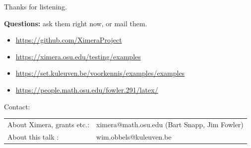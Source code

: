 \begin{frame}[t]{\centering Thanks for listening.}

  
  \vfill
  \textbf{\Large Questions:} ask them right now, or mail them.
  \vfill
  \begin{itemize}
  \item \url{https://github.com/XimeraProject}
  \item \url{https://ximera.osu.edu/testing/examples}
  \item \url{https://set.kuleuven.be/voorkennis/examples/examples}
  \item \url{https://people.math.osu.edu/fowler.291/latex/}
  \end{itemize}
  \vfill

  Contact: \\[0.5cm]

  \begin{tabular}{ll}
    About Ximera, grants etc.: & ximera@math.osu.edu    (Bart Snapp, Jim Fowler) \\
    About this talk :          & wim.obbels@kuleuven.be
  \end{tabular}    
  \vfill
\end{frame}


